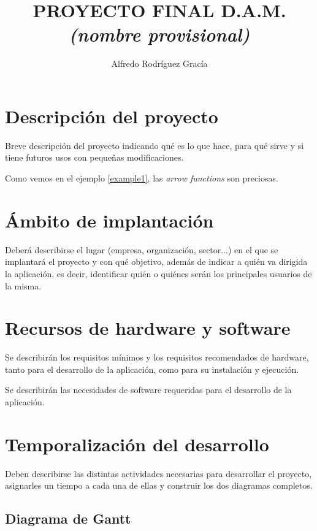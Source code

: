 \documentclass[12pt,a4paper,titlepage]{article}
\title{PROYECTO FINAL D.A.M.\\\emph{\small{(nombre provisional)}}}
\author{Alfredo Rodríguez Gracía}
\begin{document}
    \maketitle
    \tableofcontents
    \lstlistoflistings
    \newpage

    \section{Descripción del proyecto}

    Breve descripción del proyecto indicando qué es lo que hace, para qué sirve y si tiene futuros usos con pequeñas modificaciones.

    Como vemos en el ejemplo \ref{example1}, las \emph{arrow functions} son preciosas.

    \section{Ámbito de implantación}

    Deberá describirse el lugar (empresa, organización, sector...) en el que se implantará el proyecto y con qué objetivo, además de indicar a quién va dirigida la aplicación, es decir, identificar quién o quiénes serán los principales usuarios de la misma.

    \section{Recursos de hardware y software}

    Se describirán los requisitos mínimos y los requisitos recomendados de hardware, tanto para el desarrollo de la aplicación, como para su instalación y ejecución.

    Se describirán las necesidades de software requeridas para el desarrollo de la aplicación.

    \section{Temporalización del desarrollo}

    Deben describirse las distintas actividades necesarias para desarrollar el proyecto, asignarles un tiempo a cada una de ellas y construir los dos diagramas completos.

    \subsection{Diagrama de Gantt}
\end{document}
